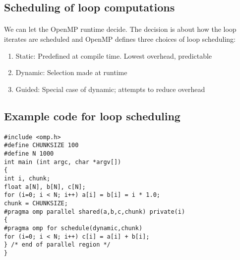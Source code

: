 \documentclass[%
oneside,                 %
final,                   %
10pt]{article}
\begin{document}
\subsection*{Scheduling of  loop computations}


\paragraph{}
We can let  the OpenMP runtime decide. The decision is about how the loop iterates are scheduled
and  OpenMP defines three choices of loop scheduling:
\begin{enumerate}
\item Static: Predefined at compile time. Lowest overhead, predictable

\item Dynamic: Selection made at runtime 

\item Guided: Special case of dynamic; attempts to reduce overhead
\end{enumerate}

\noindent



\subsection*{Example code for loop scheduling}

\paragraph{}
















\begin{verbatim}
#include <omp.h>
#define CHUNKSIZE 100
#define N 1000
int main (int argc, char *argv[])
{
int i, chunk;
float a[N], b[N], c[N];
for (i=0; i < N; i++) a[i] = b[i] = i * 1.0;
chunk = CHUNKSIZE;
#pragma omp parallel shared(a,b,c,chunk) private(i)
{
#pragma omp for schedule(dynamic,chunk)
for (i=0; i < N; i++) c[i] = a[i] + b[i];
} /* end of parallel region */
}

\end{verbatim}
\end{document}
